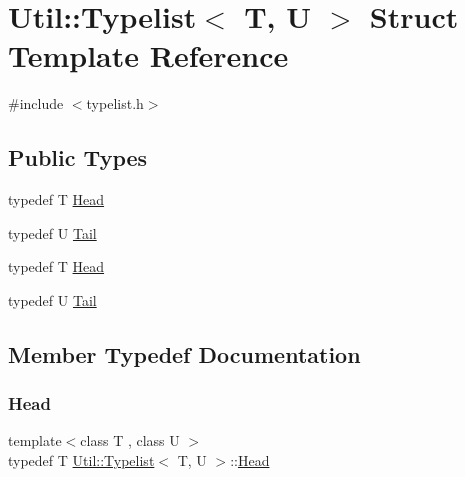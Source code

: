 \hypertarget{structUtil_1_1Typelist}{}\section{Util\+:\+:Typelist$<$ T, U $>$ Struct Template Reference}
\label{structUtil_1_1Typelist}


{\ttfamily \#include $<$typelist.\+h$>$}

\subsection*{Public Types}
\begin{DoxyCompactItemize}
\item 
typedef T \mbox{\hyperlink{structUtil_1_1Typelist_adc631e8685518837efd57d234d33982e}{Head}}
\item 
typedef U \mbox{\hyperlink{structUtil_1_1Typelist_a9c02512c1b76c9340e36855f76ff5f01}{Tail}}
\item 
typedef T \mbox{\hyperlink{structUtil_1_1Typelist_adc631e8685518837efd57d234d33982e}{Head}}
\item 
typedef U \mbox{\hyperlink{structUtil_1_1Typelist_a9c02512c1b76c9340e36855f76ff5f01}{Tail}}
\end{DoxyCompactItemize}


\subsection{Member Typedef Documentation}
\mbox{\label{structUtil_1_1Typelist_adc631e8685518837efd57d234d33982e}} 
\subsubsection{\texorpdfstring{Head}{Head}\hspace{0.1cm}{\footnotesize\ttfamily [1/2]}}
{\footnotesize\ttfamily template$<$class T , class U $>$ \\
typedef T \mbox{\hyperlink{structUtil_1_1Typelist}{Util\+::\+Typelist}}$<$ T, U $>$\+::\mbox{\hyperlink{structUtil_1_1Typelist_adc631e8685518837efd57d234d33982e}{Head}}}

\mbox{\label{structUtil_1_1Typelist_adc631e8685518837efd57d234d33982e}} 
